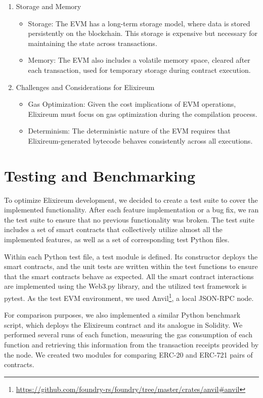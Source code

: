 \begin{enumerate}
    \item Storage and Memory
          \begin{itemize}
              \item   Storage: The EVM has a long-term storage model, where data is stored persistently on the blockchain. This storage is expensive but necessary for maintaining the state across transactions.
              \item         Memory: The EVM also includes a volatile memory space, cleared after each transaction, used for temporary storage during contract execution.
          \end{itemize}
    \item Challenges and Considerations for Elixireum
          \begin{itemize}
              \item Gas Optimization: Given the cost implications of EVM operations, Elixireum must focus on gas optimization during the compilation process.
              \item Determinism: The deterministic nature of the EVM requires that Elixireum-generated bytecode behaves consistently across all executions.
          \end{itemize}



\end{enumerate}

\section{Testing and Benchmarking}
\label{sec:test_suite}

To optimize Elixireum development, we decided to create a test suite to cover the implemented functionality. After each feature implementation or a bug fix, we ran the test suite to ensure that no previous functionality was broken. The test suite includes a set of smart contracts that collectively utilize almost all the implemented features, as well as a set of corresponding test Python files.

Within each Python test file, a test module is defined. Its constructor deploys the smart contracts, and the unit tests are written within the test functions to ensure that the smart contracts behave as expected. All the smart contract interactions are implemented using the Web3.py library, and the utilized test framework is pytest. As the test EVM environment, we used Anvil\footnote{\url{https://github.com/foundry-rs/foundry/tree/master/crates/anvil\#anvil}}, a local JSON-RPC node.

For comparison purposes, we also implemented a similar Python benchmark script, which deploys the Elixireum contract and its analogue in Solidity. We performed several runs of each function, measuring the gas consumption of each function and retrieving this information from the transaction receipts provided by the node. We created two modules for comparing ERC-20 and ERC-721 pairs of contracts.
